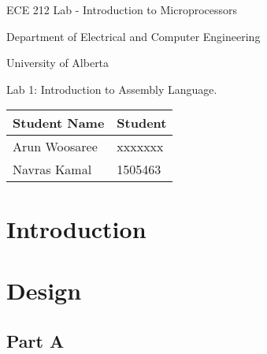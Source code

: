 \documentclass[letterpaper]{article}
\begin{document}
  \begin{titlepage}
    \begin{center}

      \LARGE
      ECE 212 Lab - Introduction to Microprocessors

      Department of Electrical and Computer Engineering

      University of Alberta

      \vspace{2cm}

      Lab 1: Introduction to Assembly Language.

      \vspace{5cm}
      \Large

      \begin{tabular}{ | m{5cm} | m{5cm} | }
        \hline
        Student Name & Student \\
        \hline
        Arun Woosaree & xxxxxxx \\
        \hline
        Navras Kamal & 1505463 \\
        \hline
      \end{tabular}




    \end{center}
\end{titlepage}


\tableofcontents
\newpage

\section{Introduction}
  \lipsum[1]
  \lipsum[2]

\section{Design}
  \subsection{Part A}
    \lipsum[3]
\end{document}
